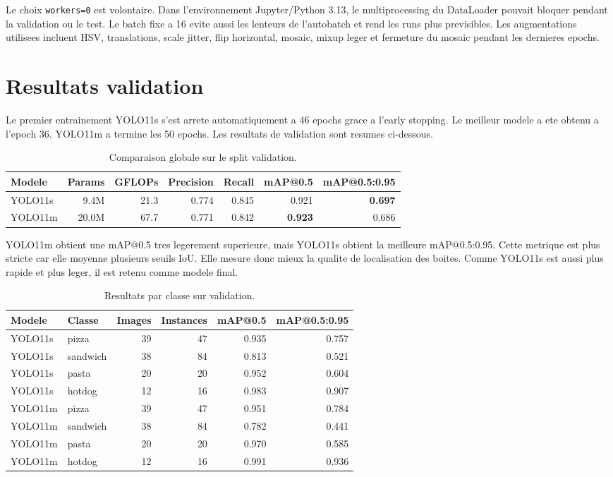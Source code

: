 \documentclass[11pt,a4paper]{article}
\begin{document}
Le choix \texttt{workers=0} est volontaire. Dans l'environnement Jupyter/Python
3.13, le multiprocessing du DataLoader pouvait bloquer pendant la validation ou le
test. Le batch fixe a 16 evite aussi les lenteurs de l'autobatch et rend les runs
plus previsibles. Les augmentations utilisees incluent HSV, translations, scale
jitter, flip horizontal, mosaic, mixup leger et fermeture du mosaic pendant les
dernieres epochs.

\section{Resultats validation}
Le premier entrainement YOLO11s s'est arrete automatiquement a 46 epochs grace a
l'early stopping. Le meilleur modele a ete obtenu a l'epoch 36. YOLO11m a termine
les 50 epochs. Les resultats de validation sont resumes ci-dessous.

\begin{table}[H]
\centering
\begin{tabular}{lrrrrrr}
\toprule
Modele & Params & GFLOPs & Precision & Recall & mAP@0.5 & mAP@0.5:0.95 \\
\midrule
YOLO11s & 9.4M & 21.3 & 0.774 & 0.845 & 0.921 & \textbf{0.697} \\
YOLO11m & 20.0M & 67.7 & 0.771 & 0.842 & \textbf{0.923} & 0.686 \\
\bottomrule
\end{tabular}
\caption{Comparaison globale sur le split validation.}
\label{tab:val_global}
\end{table}

YOLO11m obtient une mAP@0.5 tres legerement superieure, mais YOLO11s obtient la
meilleure mAP@0.5:0.95. Cette metrique est plus stricte car elle moyenne plusieurs
seuils IoU. Elle mesure donc mieux la qualite de localisation des boites. Comme
YOLO11s est aussi plus rapide et plus leger, il est retenu comme modele final.

\begin{table}[H]
\centering
\begin{tabular}{llrrrr}
\toprule
Modele & Classe & Images & Instances & mAP@0.5 & mAP@0.5:0.95 \\
\midrule
YOLO11s & pizza & 39 & 47 & 0.935 & 0.757 \\
YOLO11s & sandwich & 38 & 84 & 0.813 & 0.521 \\
YOLO11s & pasta & 20 & 20 & 0.952 & 0.604 \\
YOLO11s & hotdog & 12 & 16 & 0.983 & 0.907 \\
\midrule
YOLO11m & pizza & 39 & 47 & 0.951 & 0.784 \\
YOLO11m & sandwich & 38 & 84 & 0.782 & 0.441 \\
YOLO11m & pasta & 20 & 20 & 0.970 & 0.585 \\
YOLO11m & hotdog & 12 & 16 & 0.991 & 0.936 \\
\bottomrule
\end{tabular}
\caption{Resultats par classe sur validation.}
\label{tab:val_per_class}
\end{table}
\end{document}
